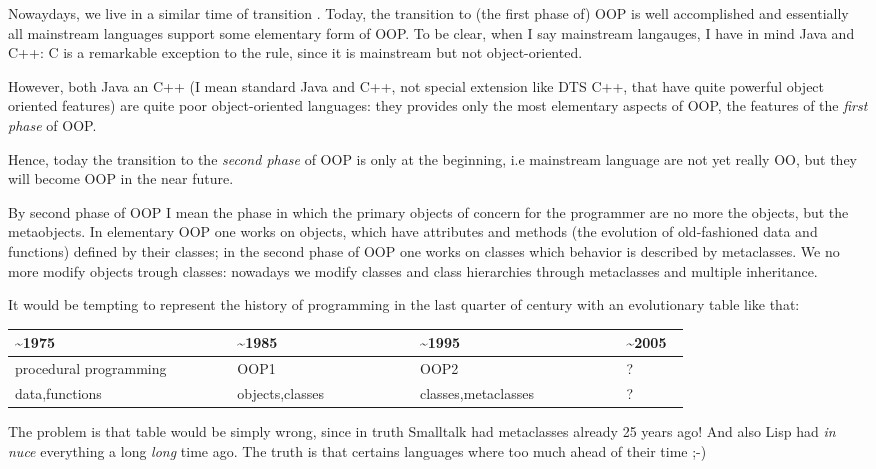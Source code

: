 \documentclass[11pt,english]{book}
\begin{document}
Nowaydays, we live in a similar time of transition . Today, the transition 
to (the first phase of) OOP is well accomplished and essentially all 
mainstream
languages support some elementary form of OOP. To be clear, when I say
mainstream langauges, I have in mind Java and C++: C is a remarkable 
exception to the  rule, since it is mainstream but not object-oriented.

However, both Java an C++ (I mean standard Java and C++, not special
extension like DTS C++, that have quite powerful object oriented features)
are quite poor object-oriented languages: they provides only the most 
elementary aspects of OOP, the features of the \emph{first phase} of OOP.

Hence, today the transition to the \emph{second phase} of OOP is only at the 
beginning, i.e mainstream language are not yet really OO, but they will
become OOP in the near future.

By second phase of OOP I mean the phase in which the primary
objects of concern for the programmer are no more the objects, but the
metaobjects. In elementary OOP one works on objects, which have attributes
and methods (the evolution of old-fashioned data and functions)  defined
by their classes; in the second phase of OOP one works on classes 
which behavior is described by metaclasses. We no more modify objects 
trough classes: nowadays we modify classes and class hierarchies 
through metaclasses and multiple inheritance.

It would be tempting to represent the history of programming in the last
quarter of century with an evolutionary table like that:

\begin{longtable}[c]{|p{0.28\linewidth}|p{0.23\linewidth}|p{0.26\linewidth}|p{0.08\linewidth}|}
\hline
\textbf{
{\~{ }}1975
} & \textbf{
{\~{ }}1985
} & \textbf{
{\~{ }}1995
} & \textbf{
{\~{ }}2005
} \\ \hline
\endhead

procedural programming
 & 
OOP1
 & 
OOP2
 & 
?
 \\ \hline

data,functions
 & 
objects,classes
 & 
classes,metaclasses
 & 
?
 \\ \hline
\end{longtable}

The problem is that table would be simply wrong, since in truth
Smalltalk had metaclasses already 25 years ago! And also Lisp
had \emph{in nuce} everything a long \emph{long} time ago.
The truth is that certains languages where too much ahead of their 
time ;-)
\end{document}
